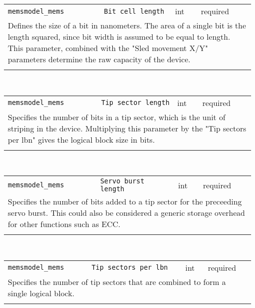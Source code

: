 \noindent 
\begin{tabular}{|p{\lpmodwidth}|p{\lpnamewidth}|p{0.5in}|p{0.5in}|}
\cline{1-4}
\texttt{memsmodel\_mems} & \texttt{Bit cell length} & int & required \\ 
\cline{1-4}
\multicolumn{4}{|p{6in}|}{
Defines the size of a bit in nanometers. The area of a single bit is
the length squared, since bit width is assumed to be equal to length.
This parameter, combined with the "Sled movement X/Y" parameters
determine the raw capacity of the device.
}\\ 
\cline{1-4}
\multicolumn{4}{p{5in}}{}\\
\end{tabular}\\ 
\noindent 
\begin{tabular}{|p{\lpmodwidth}|p{\lpnamewidth}|p{0.5in}|p{0.5in}|}
\cline{1-4}
\texttt{memsmodel\_mems} & \texttt{Tip sector length} & int & required \\ 
\cline{1-4}
\multicolumn{4}{|p{6in}|}{
Specifies the number of bits in a tip sector, which is the unit of
striping in the device. Multiplying this parameter by the "Tip
sectors per lbn" gives the logical block size in bits.
}\\ 
\cline{1-4}
\multicolumn{4}{p{5in}}{}\\
\end{tabular}\\ 
\noindent 
\begin{tabular}{|p{\lpmodwidth}|p{\lpnamewidth}|p{0.5in}|p{0.5in}|}
\cline{1-4}
\texttt{memsmodel\_mems} & \texttt{Servo burst length} & int & required \\ 
\cline{1-4}
\multicolumn{4}{|p{6in}|}{
Specifies the number of bits added to a tip sector for the preceeding
servo burst. This could also be considered a generic storage overhead
for other functions such as ECC.
}\\ 
\cline{1-4}
\multicolumn{4}{p{5in}}{}\\
\end{tabular}\\ 
\noindent 
\begin{tabular}{|p{\lpmodwidth}|p{\lpnamewidth}|p{0.5in}|p{0.5in}|}
\cline{1-4}
\texttt{memsmodel\_mems} & \texttt{Tip sectors per lbn} & int & required \\ 
\cline{1-4}
\multicolumn{4}{|p{6in}|}{
Specifies the number of tip sectors that are combined to form a single
logical block.
}\\ 
\cline{1-4}
\multicolumn{4}{p{5in}}{}\\
\end{tabular}\\ 
